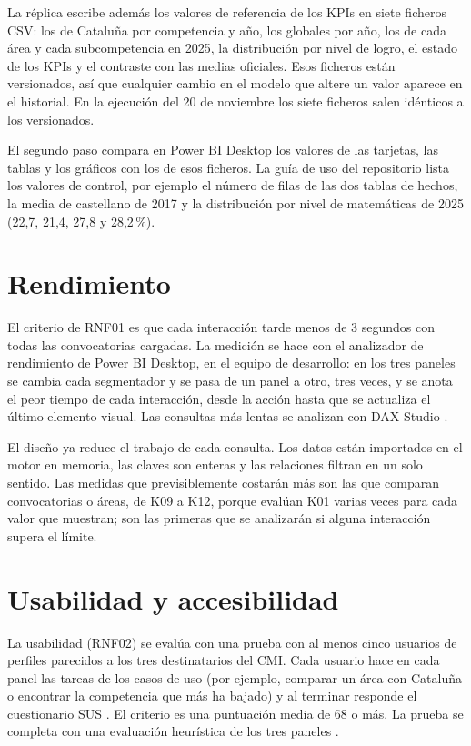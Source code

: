 \documentclass[12pt, a4paper, oneside]{report}
\begin{document}
La réplica escribe además los valores de referencia de los KPIs en siete ficheros CSV: los de Cataluña por competencia y año, los globales por año, los de cada área y cada subcompetencia en 2025, la distribución por nivel de logro, el estado de los KPIs y el contraste con las medias oficiales. Esos ficheros están versionados, así que cualquier cambio en el modelo que altere un valor aparece en el historial. En la ejecución del 20 de noviembre los siete ficheros salen idénticos a los versionados.

El segundo paso compara en Power BI Desktop los valores de las tarjetas, las tablas y los gráficos con los de esos ficheros. La guía de uso del repositorio lista los valores de control, por ejemplo el número de filas de las dos tablas de hechos, la media de castellano de 2017 y la distribución por nivel de matemáticas de 2025 (22,7, 21,4, 27,8 y 28,2\,\%).

\section{Rendimiento}
\label{sec:val_rendimiento}
El criterio de RNF01 es que cada interacción tarde menos de 3 segundos con todas las convocatorias cargadas. La medición se hace con el analizador de rendimiento de Power BI Desktop, en el equipo de desarrollo: en los tres paneles se cambia cada segmentador y se pasa de un panel a otro, tres veces, y se anota el peor tiempo de cada interacción, desde la acción hasta que se actualiza el último elemento visual. Las consultas más lentas se analizan con DAX Studio \cite{dax_studio}.

El diseño ya reduce el trabajo de cada consulta. Los datos están importados en el motor en memoria, las claves son enteras y las relaciones filtran en un solo sentido. Las medidas que previsiblemente costarán más son las que comparan convocatorias o áreas, de K09 a K12, porque evalúan K01 varias veces para cada valor que muestran; son las primeras que se analizarán si alguna interacción supera el límite.

\section{Usabilidad y accesibilidad}
\label{sec:val_usabilidad}
La usabilidad (RNF02) se evalúa con una prueba con al menos cinco usuarios de perfiles parecidos a los tres destinatarios del CMI. Cada usuario hace en cada panel las tareas de los casos de uso (por ejemplo, comparar un área con Cataluña o encontrar la competencia que más ha bajado) y al terminar responde el cuestionario SUS \cite{brooke1996sus}. El criterio es una puntuación media de 68 o más. La prueba se completa con una evaluación heurística de los tres paneles \cite{nielsen1993usability}.
\end{document}
